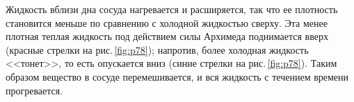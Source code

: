 \documentclass[main.tex]{subfiles}
\begin{document}
{{%







    \smallskip
    
    Жидкость вблизи дна сосуда нагревается и расширяется, так что ее плотность становится меньше по сравнению с холодной жидкостью сверху. Эта менее плотная теплая жидкость под действием силы Архимеда
    поднимается вверх (красные стрелки на рис.\,\ref{fig:p78}); напротив, более холодная жидкость <<тонет>>, то есть опускается вниз (синие стрелки на рис.\,\ref{fig:p78}). Таким образом вещество в сосуде перемешивается, и вся жидкость с течением времени прогревается.  
   
}

}


\tikzfading[name=fade out,
inner color=transparent!0,
outer color=transparent!100]
\end{document}
